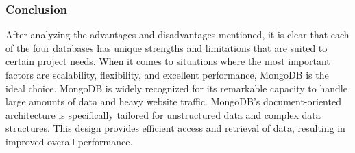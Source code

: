 \subsubsection{Conclusion}

After analyzing the advantages and disadvantages mentioned, it is clear that each of the four databases has unique strengths and limitations that are suited to certain project needs. When it comes to situations where the most important factors are scalability, flexibility, and excellent performance, MongoDB is the ideal choice. MongoDB is widely recognized for its remarkable capacity to handle large amounts of data and heavy website traffic. MongoDB's document-oriented architecture is specifically tailored for unstructured data and complex data structures. This design provides efficient access and retrieval of data, resulting in improved overall performance.